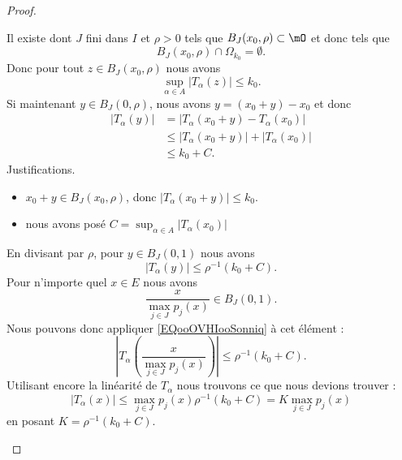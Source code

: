 \begin{proof}
\begin{subproof}
		Il existe dont \( J\) fini dans \( I\) et \( \rho>0\) tels que \( B_J(x_0,\rho)\subset \mO\) et donc tels que
		\begin{equation}
			B_J(x_0,\rho)\cap\Omega_{k_0}=\emptyset.
		\end{equation}
		Donc pour tout \( z\in B_J(x_0,\rho)\) nous avons
		\begin{equation}
			\sup_{\alpha\in A}\big| T_{\alpha}(z) \big|\leq k_0.
		\end{equation}
		Si maintenant \( y\in B_J(0,\rho)\), nous avons \( y=(x_0+y)-x_0\) et donc
		\begin{subequations}
			\begin{align}
				\big| T_{\alpha}(y) \big| & =\big| T_{\alpha}(x_0+y)-T_{\alpha}(x_0) \big|                 \\
				                          & \leq \big| T_{\alpha}(x_0+y) \big|+\big| T_{\alpha}(x_0) \big| \\
				                          & \leq k_0+C.
			\end{align}
		\end{subequations}
		Justifications.
		\begin{itemize}
			\item
			      \( x_0+y\in B_J(x_0,\rho)\), donc \( \big| T_{\alpha}(x_0+y) \big|\leq k_0\).
			\item
			      nous avons posé \( C=\sup_{\alpha\in A}\big| T_{\alpha}(x_0) \big|\)
		\end{itemize}
		En divisant par \( \rho\), pour \( y\in B_J(0,1)\) nous avons
		\begin{equation}        \label{EQooOVHIooSonniq}
			\big| T_{\alpha}(y) \big|\leq \rho^{-1}(k_0+C).
		\end{equation}
		Pour n'importe quel \( x\in E\) nous avons
		\begin{equation}
			\frac{ x }{ \max_{j\in J}p_j(x) }\in B_J(0,1).
		\end{equation}
		Nous pouvons donc appliquer \eqref{EQooOVHIooSonniq} à cet élément :
		\begin{equation}
			\left| T_{\alpha}\left( \frac{ x }{ \max_{j\in J} p_j(x) } \right) \right| \leq \rho^{-1}(k_0+C).
		\end{equation}
		Utilisant encore la linéarité de \( T_{\alpha}\) nous trouvons ce que nous devions trouver :
		\begin{equation}
			\big| T_{\alpha}(x) \big|\leq \max_{j\in J}p_j(x)\rho^{-1}(k_0+C)=K\max_{j\in J}p_j(x)
		\end{equation}
		en posant \(K= \rho^{-1}(k_0+C)\).
	\end{subproof}
\end{proof}


